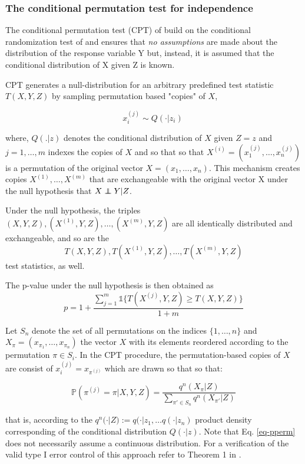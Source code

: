\documentclass{article}
\begin{document}
\subsubsection*{The conditional permutation test for independence}

The conditional permutation test (CPT) of \cite{berrett2020conditional} build on the conditional randomization test of \cite{candes2016panning} and ensures that \emph{no assumptions} are made about the distribution of the response variable Y but, instead, it is assumed that the conditional distribution of X given Z is known.

CPT generates a null-distribution for an arbitrary predefined test statistic $T(X,Y,Z)$ by sampling permutation based "copies" of $X$,

$$x_i^{(j)} \sim Q(\cdot|z_i) \ $$

where, $Q(.|z)$ denotes the conditional distribution of $X$ given $Z=z$ and $j=1,\dots, m$ indexes the copies of $X$ and so that so that $X^{(i)} = (x_1^{(j)}, \dots, x_n^{(j)})$ is a permutation of the original vector $X = (x_1, \dots, x_n)$. This mechanism creates copies $X^{(1)}, \dots ,X^{(m)}$ that are exchangeable with the original vector X under the null hypothesis that $X \independent Y | Z$.

Under the null hypothesis, the triples $(X,Y,Z), (X^{(1)},Y,Z),\dots,(X^{(m)},Y,Z)$ are all identically distributed and exchangeable, and so are the 
$$T(X,Y,Z), T(X^{(1)},Y,Z),\dots,T(X^{(m)},Y,Z)$$
test statistics, as well.

The p-value under the null hypothesis is then obtained as
$$ p= 1+\frac{\sum_{j=1}^m \mathbb{1} \{T(X^{(j)},Y,Z) \geq T(X,Y,Z) \}  }{1+m}$$

Let $S_n$ denote the set of all permutations on the indices $\{1,\dots,n\}$ and $X_\pi = (x_{\pi_1}, \dots, x_{\pi_n})$ the vector $X$ with its elements reordered according to the permutation $\pi \in S_i$.
In the CPT procedure, the permutation-based copies of $X$ are consist of $x_i^{(j)} = x_{\pi^{(j)}}$ which are drawn so that 
so that:

\begin{equation}
    \mathbb{P}(\pi^{(j)} = \pi | X,Y,Z) = \frac{q^n(X_\pi | Z)}{\sum_{\pi' \in S_n} q^n(X_{\pi'} | Z)}
    \label{eq-pperm}
\end{equation}

that is, according to the $q^n(\cdot|Z) := q(\cdot | z_1, \dots q(\cdot|z_n)$ product density corresponding of the conditional distribution $Q(\cdot|z)$. Note that Eq. \ref{eq-pperm} does not necessarily assume a continuous distribution.
For a verification of the valid type I error control of this approach refer to Theorem 1 in \citep{berrett2020conditional}.
\end{document}
